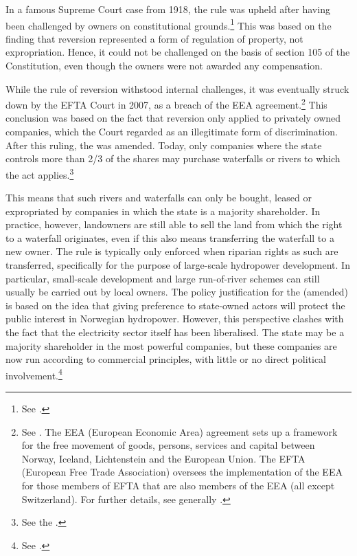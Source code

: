 In a famous Supreme Court case from 1918, the rule was upheld after having been challenged by owners on constitutional grounds.\footnote{See \cite{johansen18}.} This was based on the finding that reversion represented a form of regulation of property, not expropriation. Hence, it could not be challenged on the basis of section 105 of the Constitution, even though the owners were not awarded any compensation. 

While the rule of reversion withstood internal challenges, it was eventually struck down by the EFTA Court in 2007, as a breach of the EEA agreement.\footnote{See \cite{efta07}. The EEA (European Economic Area) agreement sets up a framework for the free movement of goods, persons, services and capital between Norway, Iceland, Lichtenstein and the European Union. The EFTA (European Free Trade Association) oversees the implementation of the EEA for those members of EFTA that are also members of the EEA (all except Switzerland). For further details, see generally \cite{bull94,magnussen02,fredriksen09}.} This conclusion was based on the fact that reversion only applied to privately owned companies, which the Court regarded as an illegitimate form of discrimination. After this ruling, the \cite{ica17} was amended. Today, only companies where the state controls more than 2/3 of the shares may purchase waterfalls or rivers to which the act applies.\footnote{See the \cite[2]{ica17}.}

This means that such rivers and waterfalls can only be bought, leased or expropriated by companies in which the state is a majority shareholder. In practice, however, landowners are still able to sell the land from which the right to a waterfall originates, even if this also means transferring the waterfall to a new owner. The rule is typically only enforced when riparian rights as such are transferred, specifically for the purpose of large-scale hydropower development. In particular, small-scale development and large run-of-river schemes can still usually be carried out by local owners. The policy justification for the (amended) \cite{ica17} is based on the idea that giving preference to state-owned actors will protect the public interest in Norwegian hydropower. However, this perspective clashes with the fact that the electricity sector itself has been liberalised. The state may be a majority shareholder in the most powerful companies, but these companies are now run according to 
commercial principles, with little or no direct political involvement.\footnote{See \cite[86]{efta07}.}

